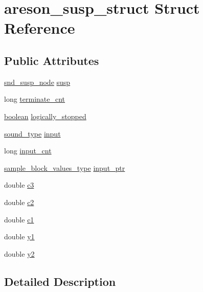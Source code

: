 \hypertarget{structareson__susp__struct}{}\section{areson\+\_\+susp\+\_\+struct Struct Reference}
\label{structareson__susp__struct}
\subsection*{Public Attributes}
\begin{DoxyCompactItemize}
\item 
\hyperlink{sound_8h_a6b268203688a934bd798ceb55f85d4c0}{snd\+\_\+susp\+\_\+node} \hyperlink{structareson__susp__struct_a2c8bf2bcf7097ba80429306e52cac98a}{susp}
\item 
long \hyperlink{structareson__susp__struct_a5c9856d4a7067080cb5e35be89194a49}{terminate\+\_\+cnt}
\item 
\hyperlink{cext_8h_a7670a4e8a07d9ebb00411948b0bbf86d}{boolean} \hyperlink{structareson__susp__struct_aabc95561c283c5c1ec203c9ec16f7157}{logically\+\_\+stopped}
\item 
\hyperlink{sound_8h_a792cec4ed9d6d636d342d9365ba265ea}{sound\+\_\+type} \hyperlink{structareson__susp__struct_a73c3679f653c17ea3e3778b7b95aaef5}{input}
\item 
long \hyperlink{structareson__susp__struct_a91b0c2fd22aaab885cc9578fe5eb05f5}{input\+\_\+cnt}
\item 
\hyperlink{sound_8h_a83d17f7b465d1591f27cd28fc5eb8a03}{sample\+\_\+block\+\_\+values\+\_\+type} \hyperlink{structareson__susp__struct_a71e961a1d4e2e4c8d8c484ce3f8c46b2}{input\+\_\+ptr}
\item 
double \hyperlink{structareson__susp__struct_a8eac7c481e7bcc65c009fe6ddee49bc3}{c3}
\item 
double \hyperlink{structareson__susp__struct_a1646d658169d713a22fc4f4717cdb483}{c2}
\item 
double \hyperlink{structareson__susp__struct_aaec1fde740833af135a8b9e6029a0398}{c1}
\item 
double \hyperlink{structareson__susp__struct_a4cb469c687aabfb50fc4299537094cb6}{y1}
\item 
double \hyperlink{structareson__susp__struct_acd0279e0d58da9bd053bba443aada3ba}{y2}
\end{DoxyCompactItemize}


\subsection{Detailed Description}



